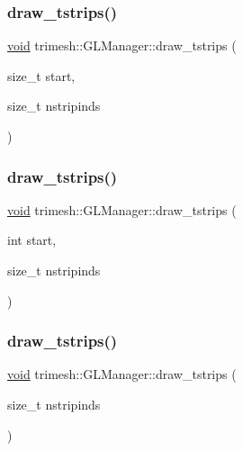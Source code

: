 \subsubsection{\texorpdfstring{draw\+\_\+tstrips()}{draw\_tstrips()}\hspace{0.1cm}{\footnotesize\ttfamily [7/9]}}
{\footnotesize\ttfamily \hyperlink{namespacetrimesh_a784ddfd979e1c579bda795a8edfc3f43}{void} trimesh\+::\+G\+L\+Manager\+::draw\+\_\+tstrips (\begin{DoxyParamCaption}\item[{size\+\_\+t}]{start,  }\item[{size\+\_\+t}]{nstripinds }\end{DoxyParamCaption})}

\mbox{\label{classtrimesh_1_1GLManager_abad080bf1631cc4703937e46c8c1b7b6}} 
\subsubsection{\texorpdfstring{draw\+\_\+tstrips()}{draw\_tstrips()}\hspace{0.1cm}{\footnotesize\ttfamily [8/9]}}
{\footnotesize\ttfamily \hyperlink{namespacetrimesh_a784ddfd979e1c579bda795a8edfc3f43}{void} trimesh\+::\+G\+L\+Manager\+::draw\+\_\+tstrips (\begin{DoxyParamCaption}\item[{int}]{start,  }\item[{size\+\_\+t}]{nstripinds }\end{DoxyParamCaption})\hspace{0.3cm}{\ttfamily [inline]}}

\mbox{\label{classtrimesh_1_1GLManager_a7cf13fe0eec1dd106ff2d55099f49fc5}} 
\subsubsection{\texorpdfstring{draw\+\_\+tstrips()}{draw\_tstrips()}\hspace{0.1cm}{\footnotesize\ttfamily [9/9]}}
{\footnotesize\ttfamily \hyperlink{namespacetrimesh_a784ddfd979e1c579bda795a8edfc3f43}{void} trimesh\+::\+G\+L\+Manager\+::draw\+\_\+tstrips (\begin{DoxyParamCaption}\item[{size\+\_\+t}]{nstripinds }\end{DoxyParamCaption})\hspace{0.3cm}{\ttfamily [inline]}}

